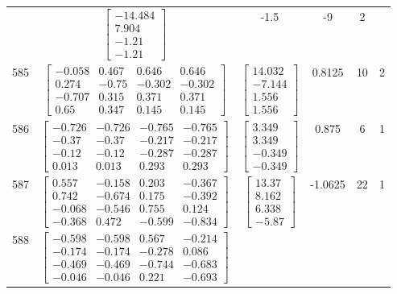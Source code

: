 \documentclass[a4paper,12pt]{article}
\begin{document}
\begin{tabular}{c c c c c c}
&
$\begin{bmatrix} -14.484 \\ 7.904 \\ -1.21 \\ -1.21 \end{bmatrix}$
&
-1.5
&
-9
&
2
\\
585
&
$\begin{bmatrix} -0.058 & 0.467 & 0.646 & 0.646 \\ 0.274 & -0.75 & -0.302 & -0.302 \\ -0.707 & 0.315 & 0.371 & 0.371 \\ 0.65 & 0.347 & 0.145 & 0.145 \end{bmatrix}$
&
$\begin{bmatrix} 14.032 \\ -7.144 \\ 1.556 \\ 1.556 \end{bmatrix}$
&
0.8125
&
10
&
2
\\
586
&
$\begin{bmatrix} -0.726 & -0.726 & -0.765 & -0.765 \\ -0.37 & -0.37 & -0.217 & -0.217 \\ -0.12 & -0.12 & -0.287 & -0.287 \\ 0.013 & 0.013 & 0.293 & 0.293 \end{bmatrix}$
&
$\begin{bmatrix} 3.349 \\ 3.349 \\ -0.349 \\ -0.349 \end{bmatrix}$
&
0.875
&
6
&
1
\\
587
&
$\begin{bmatrix} 0.557 & -0.158 & 0.203 & -0.367 \\ 0.742 & -0.674 & 0.175 & -0.392 \\ -0.068 & -0.546 & 0.755 & 0.124 \\ -0.368 & 0.472 & -0.599 & -0.834 \end{bmatrix}$
&
$\begin{bmatrix} 13.37 \\ 8.162 \\ 6.338 \\ -5.87 \end{bmatrix}$
&
-1.0625
&
22
&
1
\\
588
&
$\begin{bmatrix} -0.598 & -0.598 & 0.567 & -0.214 \\ -0.174 & -0.174 & -0.278 & 0.086 \\ -0.469 & -0.469 & -0.744 & -0.683 \\ -0.046 & -0.046 & 0.221 & -0.693 \end{bmatrix}$

\end{tabular}
\end{document}
